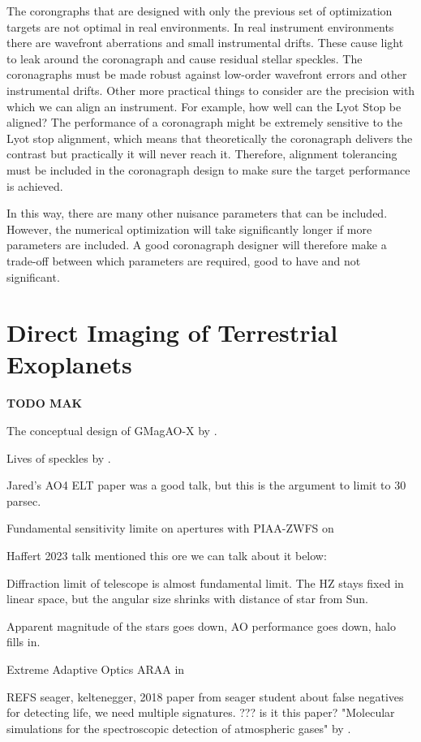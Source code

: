 \documentclass[letterpaper]{ar-1col}
\begin{document}
The corongraphs that are designed with only the previous set of optimization targets are not optimal in real environments. In real instrument environments there are wavefront aberrations and small instrumental drifts. These cause light to leak around the coronagraph and cause residual stellar speckles. The coronagraphs must be made robust against low-order wavefront errors and other instrumental drifts. Other more practical things to consider are the precision with which we can align an instrument. For example, how well can the Lyot Stop be aligned? The performance of a coronagraph might be extremely sensitive to the Lyot stop alignment, which means that theoretically the coronagraph delivers the contrast but practically it will never reach it. Therefore, alignment tolerancing must be included in the coronagraph design to make sure the target performance is achieved.

In this way, there are many other nuisance parameters that can be included. However, the numerical optimization will take significantly longer if more parameters are included. A good coronagraph designer will therefore make a trade-off between which parameters are required, good to have and not significant.


\section{Direct Imaging of Terrestrial Exoplanets}

{\bf TODO MAK}


The conceptual design of GMagAO-X by \citet{Males22}.

Lives of speckles by \citet{Males21}.

Jared's AO4 ELT paper was a good talk, but this is the argument to limit to 30 parsec.

Fundamental sensitivity limite on apertures with PIAA-ZWFS on \citet{Haffert23}

Haffert 2023 talk mentioned this ore we can talk about it below:

Diffraction limit of telescope is almost fundamental limit. The HZ stays fixed in linear space, but the angular size shrinks with distance of star from Sun.

Apparent magnitude of the stars goes down, AO performance goes down, halo fills in.

Extreme Adaptive Optics ARAA in \citet{Guyon18}

REFS seager, keltenegger, 2018 paper from seager student about false negatives for detecting life, we need multiple signatures. ??? is it this paper? "Molecular simulations for the spectroscopic detection of atmospheric gases" by \citet{Sousa-Silva19}.
\end{document}
